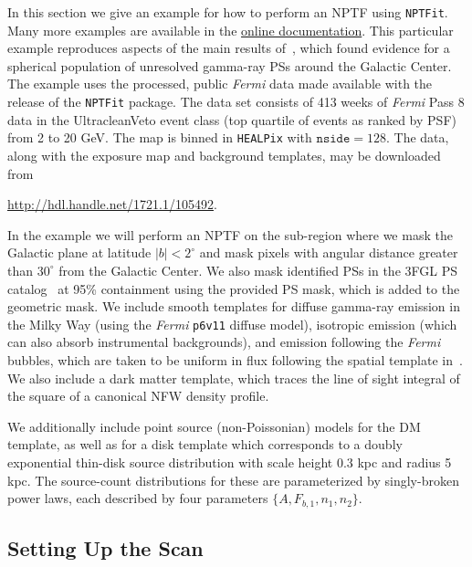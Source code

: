 In this section we give an example for how to perform an NPTF using \texttt{NPTFit}.  Many more examples are available in the \href{http://nptfit.readthedocs.io}{online documentation}.  This particular example reproduces aspects of the main results of~\cite{Lee:2015fea}, which found evidence for a spherical population of unresolved gamma-ray PSs around the Galactic Center.  The example uses the processed, public {\it Fermi} data made available with the release of the \texttt{NPTFit} package.  The data set consists of 413 weeks of \emph{Fermi} Pass 8 data in the UltracleanVeto event class (top quartile of events as ranked by PSF) from 2 to 20 GeV.  The map is binned in \texttt{HEALPix} with $\mathtt{nside} = 128$.  The data, along with the exposure map and background templates, may be downloaded from 
\begin{center}
\url{http://hdl.handle.net/1721.1/105492}.
\end{center}

In the example we will perform an NPTF on the sub-region where we mask the Galactic plane at latitude $|b| < 2^\circ$ and mask pixels with angular distance greater than $30^\circ$ from the Galactic Center.  We also mask identified PSs in the 3FGL PS catalog~\cite{Acero:2015hja} at 95\% containment using the provided PS mask, which is added to the geometric mask.  We include smooth templates for diffuse gamma-ray emission in the Milky Way (using the {\it Fermi} \texttt{p6v11} diffuse model), isotropic emission (which can also absorb instrumental backgrounds), and emission following the {\it Fermi} bubbles, which are taken to be uniform in flux following the spatial template in~\cite{Su:2010qj}.  We also include a dark matter template, which traces the line of sight integral of the square of a canonical NFW density profile.

We additionally include point source (non-Poissonian) models for the DM template, as well as for a disk template which corresponds to a doubly exponential thin-disk source distribution with scale height 0.3 kpc and radius 5 kpc. The source-count distributions for these are parameterized by singly-broken power laws, each described by four parameters $\{ A, F_{b,1}, n_1, n_2 \}$.

\subsection{Setting Up the Scan}


